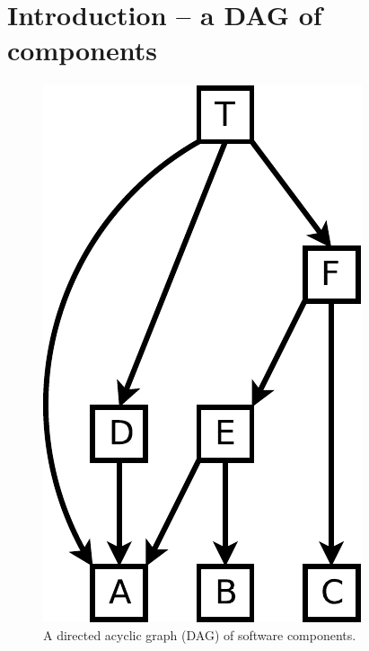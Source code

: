 \documentclass[a4paper,11pt]{article}
\author{Sébastien \textsc{Wilmet}}
\date{January 15, 2020}
\title{\documentTitle}
\begin{document}
\maketitle
\tableofcontents



\pagebreak

\section{Introduction -- a DAG of components}

\begin{figure}
  \begin{center}
    \includegraphics[scale=0.5]{images/dag.pdf}
    \caption{A directed acyclic graph (DAG) of software components.}
    \label{fig:dag}
  \end{center}
\end{figure}
\end{document}
